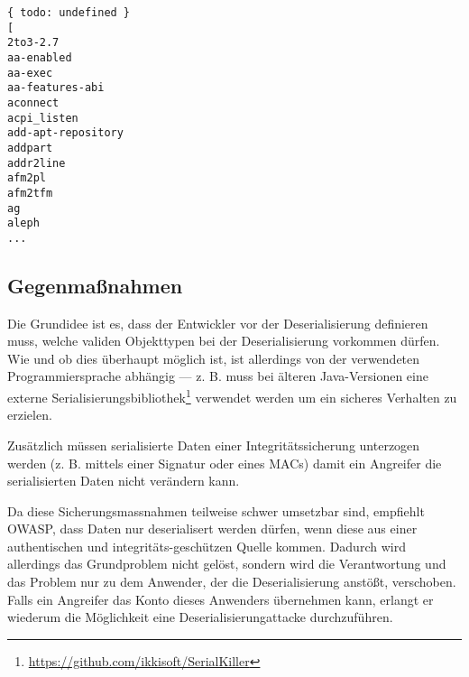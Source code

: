 \begin{verbatim}
{ todo: undefined }                                                                                                                         
[                                                                                                                                           
2to3-2.7                                                              
aa-enabled                                                                                                                                  
aa-exec                                                               
aa-features-abi                                                       
aconnect                                                              
acpi_listen                                                           
add-apt-repository                                                    
addpart                                                               
addr2line                                                             
afm2pl                                                                
afm2tfm                                                               
ag                                                                    
aleph
...
\end{verbatim}

\subsection{Gegenmaßnahmen}

Die Grundidee ist es, dass der Entwickler vor der Deserialisierung definieren muss, welche validen Objekttypen bei der Deserialisierung vorkommen dürfen. Wie und ob dies überhaupt möglich ist, ist allerdings von der verwendeten Programmiersprache abhängig --- z. B. muss bei älteren Java-Versionen eine externe Serialisierungsbibliothek\footnote{\url{https://github.com/ikkisoft/SerialKiller}} verwendet werden um ein sicheres Verhalten zu erzielen.

Zusätzlich müssen serialisierte Daten einer Integritätssicherung unterzogen werden (z. B. mittels einer Signatur oder eines MACs) damit ein Angreifer die serialisierten Daten nicht verändern kann.

Da diese Sicherungsmassnahmen teilweise schwer umsetzbar sind, empfiehlt OWASP, dass Daten nur deserialisert werden dürfen, wenn diese aus einer authentischen und integritäts-geschützen Quelle kommen. Dadurch wird allerdings das Grundproblem nicht gelöst, sondern wird die Verantwortung und das Problem nur zu dem Anwender, der die Deserialisierung anstößt, verschoben. Falls ein Angreifer das Konto dieses Anwenders übernehmen kann, erlangt er wiederum die Möglichkeit eine Deserialisierungattacke durchzuführen.

